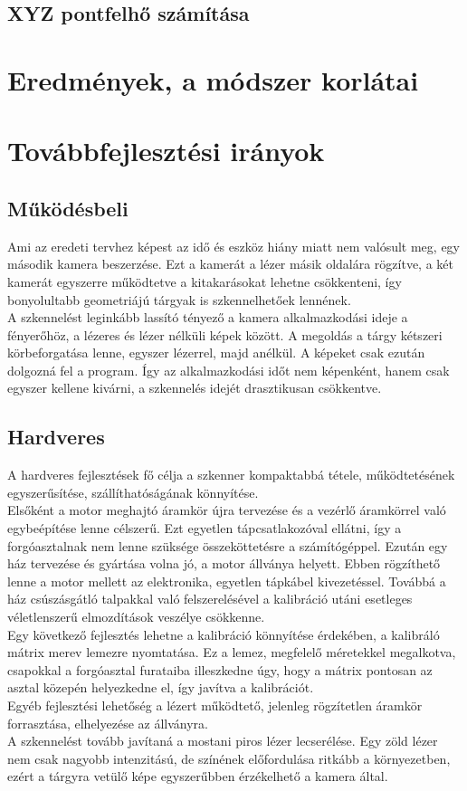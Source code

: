\documentclass[12pt,a4paper]{article}
\begin{document}
\subsection{XYZ pontfelhő számítása}
\section{Eredmények, a módszer korlátai}
\section{Továbbfejlesztési irányok}
\subsection{Működésbeli}
Ami az eredeti tervhez képest az idő és eszköz hiány miatt nem valósult meg, egy második kamera beszerzése. Ezt a kamerát a lézer másik oldalára rögzítve, a két kamerát egyszerre működtetve a kitakarásokat lehetne csökkenteni, így bonyolultabb geometriájú tárgyak is szkennelhetőek lennének.
\\[10pt]
A szkennelést leginkább lassító tényező a kamera alkalmazkodási ideje a fényerőhöz, a lézeres és lézer nélküli képek között. A megoldás a tárgy kétszeri körbeforgatása lenne, egyszer lézerrel, majd anélkül. A képeket csak ezután dolgozná fel a program. Így az alkalmazkodási időt nem képenként, hanem csak egyszer kellene kivárni, a szkennelés idejét drasztikusan csökkentve.
\subsection{Hardveres}
A hardveres fejlesztések fő célja a szkenner kompaktabbá tétele, működtetésének egyszerűsítése, szállíthatóságának könnyítése.
\\[10pt]
Elsőként a motor meghajtó áramkör újra tervezése és a vezérlő áramkörrel való egybeépítése lenne célszerű. Ezt egyetlen tápcsatlakozóval ellátni, így a forgóasztalnak nem lenne szüksége összeköttetésre a számítógéppel.
Ezután egy ház tervezése és gyártása volna jó, a motor állványa helyett. Ebben rögzíthető lenne a motor mellett az elektronika, egyetlen tápkábel kivezetéssel. Továbbá a ház csúszásgátló talpakkal való felszerelésével a kalibráció utáni esetleges véletlenszerű elmozdítások veszélye csökkenne.
\\[10pt]
Egy következő fejlesztés lehetne a kalibráció könnyítése érdekében, a kalibráló mátrix merev lemezre nyomtatása. Ez a lemez, megfelelő méretekkel megalkotva, csapokkal a forgóasztal furataiba illeszkedne úgy, hogy a mátrix pontosan az asztal közepén helyezkedne el, így javítva a kalibrációt.
\\[10pt]
Egyéb fejlesztési lehetőség a lézert működtető, jelenleg rögzítetlen áramkör forrasztása, elhelyezése az állványra.
\\[10pt]
A szkennelést tovább javítaná a mostani piros lézer lecserélése. Egy zöld lézer nem csak nagyobb intenzitású, de színének előfordulása ritkább a környezetben, ezért a tárgyra vetülő képe egyszerűbben érzékelhető a kamera által.
\end{document}
